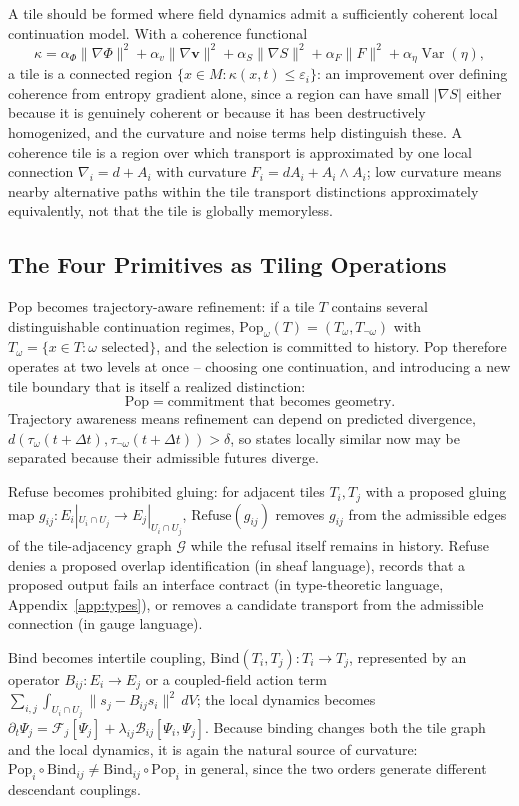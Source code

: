 \documentclass[11pt]{article}
\newcommand{\Pop}{\mathrm{Pop}}
\newcommand{\Refuse}{\mathrm{Refuse}}
\newcommand{\Bind}{\mathrm{Bind}}
\begin{document}
A tile should be formed where field dynamics admit a sufficiently coherent local continuation model. With a coherence functional
\[
\kappa = \alpha_\Phi \|\nabla \Phi\|^2 + \alpha_v \|\nabla \mathbf{v}\|^2 + \alpha_S \|\nabla S\|^2 + \alpha_F \|F\|^2 + \alpha_\eta \operatorname{Var}(\eta),
\]
a tile is a connected region $\{x \in M : \kappa(x,t) \leq \varepsilon_i\}$: an improvement over defining coherence from entropy gradient alone, since a region can have small $|\nabla S|$ either because it is genuinely coherent or because it has been destructively homogenized, and the curvature and noise terms help distinguish these. A coherence tile is a region over which transport is approximated by one local connection $\nabla_i = d + A_i$ with curvature $F_i = dA_i + A_i \wedge A_i$; low curvature means nearby alternative paths within the tile transport distinctions approximately equivalently, not that the tile is globally memoryless.

\subsection{The Four Primitives as Tiling Operations}

$\Pop$ becomes trajectory-aware refinement: if a tile $T$ contains several distinguishable continuation regimes, $\Pop_\omega(T) = (T_\omega, T_{\neg\omega})$ with $T_\omega = \{x \in T : \omega \text{ selected}\}$, and the selection is committed to history. Pop therefore operates at two levels at once -- choosing one continuation, and introducing a new tile boundary that is itself a realized distinction:
\[
\Pop = \text{commitment that becomes geometry.}
\]
Trajectory awareness means refinement can depend on predicted divergence, $d(\tau_\omega(t+\Delta t), \tau_{\neg\omega}(t+\Delta t)) > \delta$, so states locally similar now may be separated because their admissible futures diverge.

$\Refuse$ becomes prohibited gluing: for adjacent tiles $T_i, T_j$ with a proposed gluing map $g_{ij} : E_i|_{U_i \cap U_j} \to E_j|_{U_i \cap U_j}$, $\Refuse(g_{ij})$ removes $g_{ij}$ from the admissible edges of the tile-adjacency graph $\mathcal{G}$ while the refusal itself remains in history. Refuse denies a proposed overlap identification (in sheaf language), records that a proposed output fails an interface contract (in type-theoretic language, Appendix~\ref{app:types}), or removes a candidate transport from the admissible connection (in gauge language).

$\Bind$ becomes intertile coupling, $\Bind(T_i, T_j) : T_i \to T_j$, represented by an operator $B_{ij} : E_i \to E_j$ or a coupled-field action term $\sum_{i,j} \int_{U_i \cap U_j} \|s_j - B_{ij} s_i\|^2\, dV$; the local dynamics becomes $\partial_t \Psi_j = \mathcal{F}_j[\Psi_j] + \lambda_{ij} \mathcal{B}_{ij}[\Psi_i, \Psi_j]$. Because binding changes both the tile graph and the local dynamics, it is again the natural source of curvature: $\Pop_i \circ \Bind_{ij} \neq \Bind_{ij} \circ \Pop_i$ in general, since the two orders generate different descendant couplings.
\end{document}

